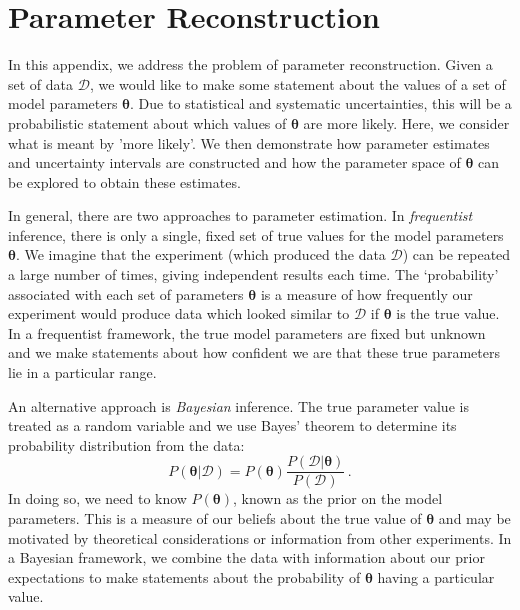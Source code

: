 \chapter{Parameter Reconstruction}
\label{ch:ParamRecon}



In this appendix, we address the problem of parameter reconstruction. Given a set of data $\mathcal{D}$, we would like to make some statement about the values of a set of model parameters $\mathbf{\theta}$. Due to statistical and systematic uncertainties, this will be a probabilistic statement about which values of $\mathbf{\theta}$ are more likely. Here, we consider what is meant by 'more likely'. We then demonstrate how parameter estimates and uncertainty intervals are constructed and how the parameter space of $\mathbf{\theta}$ can be explored to obtain these estimates.

In general, there are two approaches to parameter estimation. In \textit{frequentist} inference, there is only a single, fixed set of true values for the model parameters $\boldsymbol\theta$. We imagine that the experiment (which produced the data $\mathcal{D}$) can be repeated a large number of times, giving independent results each time. The `probability' associated with each set of parameters $\boldsymbol\theta$ is a measure of how frequently our experiment would produce data which looked similar to $\mathcal{D}$ if $\boldsymbol\theta$ is the true value. In a frequentist framework, the true model parameters are fixed but unknown and we make statements about how confident we are that these true parameters lie in a particular range.

An alternative approach is \textit{Bayesian} inference. The true parameter value is treated as a random variable and we use Bayes' theorem to determine its probability distribution from the data:
\begin{equation}
P(\boldsymbol\theta|\mathcal{D}) = P(\boldsymbol\theta) \frac{P(\mathcal{D}|\boldsymbol\theta)}{P(\mathcal{D})}\,.
\end{equation}
In doing so, we need to know $P(\boldsymbol\theta)$, known as the prior on the model parameters. This is a measure of our beliefs about the true value of $\boldsymbol\theta$ and may be motivated by theoretical considerations or information from other experiments. In a Bayesian framework, we combine the data with information about our prior expectations to make statements about the probability of $\boldsymbol\theta$ having a particular value.

